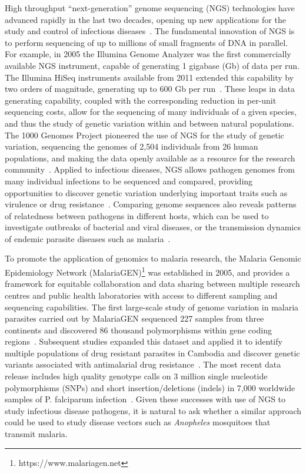\begin{refsection}
High throughput ``next-generation'' genome sequencing (NGS) technologies have advanced rapidly in the last two decades, opening up new applications for the study and control of infectious diseases~\parencite{Goodwin2016}.
%
The fundamental innovation of NGS is to perform sequencing of up to millions of small fragments of DNA in parallel.
%
For example, in 2005 the Illumina Genome Analyzer was the first commercially available NGS instrument, capable of generating 1 gigabase (Gb) of data per run.
%
The Illumina HiSeq instruments available from 2011 extended this capability by two orders of magnitude, generating up to 600 Gb per run~\parencite{Illumina2017}.
%
These leaps in data generating capability, coupled with the corresponding reduction in per-unit sequencing costs, allow for the sequencing of many individuals of a given species, and thus the study of genetic variation within and between natural populations.
%
The 1000 Genomes Project pioneered the use of NGS for the study of genetic variation, sequencing the genomes of 2,504 individuals from 26 human populations, and making the data openly available as a resource for the research community~\parencite{1000G2015}.
%
Applied to infectious diseases, NGS allows pathogen genomes from many individual infections to be sequenced and compared, providing opportunities to discover genetic variation underlying important traits such as virulence or drug resistance~\parencite{Armstrong2019}.
%
Comparing genome sequences also reveals patterns of relatedness between pathogens in different hosts, which can be used to investigate outbreaks of bacterial and viral diseases, or the transmission dynamics of endemic parasite diseases such as malaria~\parencite{Robinson2013,Daniels2015,Wohl2016,Neafsey2017,Wesolowski2018,Armstrong2019}.

To promote the application of genomics to malaria research, the Malaria Genomic Epidemiology Network (MalariaGEN)\footnote{https://www.malariagen.net} was established in 2005, and provides a framework for equitable collaboration and data sharing between multiple research centres and public health laboratories with access to different sampling and sequencing capabilities. 
%
The first large-scale study of genome variation in malaria parasites carried out by MalariaGEN sequenced 227 samples from three continents and discovered 86 thousand polymorphisms within gene coding regions~\parencite{Manske2012}.
%
Subsequent studies expanded this dataset and applied it to identify multiple populations of drug resistant parasites in Cambodia and discover genetic variants associated with antimalarial drug resistance~\parencite{Miotto2013,Miotto2015}.
%
The most recent data release includes high quality genotype calls on 3 million single nucleotide polymorphisms (SNPs) and short insertion/deletions (indels) in 7,000 worldwide samples of P. falciparum infection~\parencite{MalariaGEN2019PF}.
%
Given these successes with use of NGS to study infectious disease pathogens, it is natural to ask whether a similar approach could be used to study disease vectors such as \textit{Anopheles} mosquitoes that transmit malaria.
%



\end{refsection}

